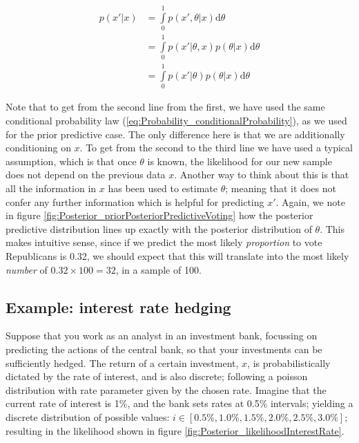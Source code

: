 \documentclass[11pt,fullpage]{book}
\begin{document}
\begin{equation}\label{eq:Posterior_posteriorPredictiveVoting}
\begin{align}
p(x'|x) &= \int\limits_{0}^{1} p(x',\theta|x) \mathrm{d}\theta\\
&= \int\limits_{0}^{1} p(x'|\theta,x) p(\theta|x) \mathrm{d}\theta\\
&= \int\limits_{0}^{1} p(x'|\theta) p(\theta|x) \mathrm{d}\theta
\end{align}
\end{equation}

Note that to get from the second line from the first, we have used the same conditional probability law  (\ref{eq:Probability_conditionalProbability}), as we used for the prior predictive case. The only difference here is that we are additionally conditioning on $x$. To get from the second to the third line we have used a typical assumption, which is that once $\theta$ is known, the likelihood for our new sample does not depend on the previous data $x$. Another way to think about this is that all the information in $x$ has been used to estimate $\theta$; meaning that it does not confer any further information which is helpful for predicting $x'$. Again, we note in figure \ref{fig:Posterior_priorPosteriorPredictiveVoting} how the posterior predictive distribution lines up exactly with the posterior distribution of $\theta$. This makes intuitive sense, since if we predict the most likely \textit{proportion} to vote Republicans is 0.32, we should expect that this will translate into the most likely \textit{number} of $0.32\times 100=32$, in a sample of 100.

\subsection{Example: interest rate hedging}
Suppose that you work as an analyst in an investment bank, focussing on predicting the actions of the central bank, so that your investments can be sufficiently hedged. The return of a certain investment, $x$, is probabilistically dictated by the rate of interest, and is also discrete; following a poisson distribution with rate parameter given by the chosen rate. Imagine that the current rate of interest is 1\%, and the bank sets rates at 0.5\% intervals; yielding a discrete distribution of possible values: $i\in[0.5\%, 1.0\%, 1.5\%, 2.0\%, 2.5\%,3.0\% ]$; resulting in the likelihood shown in figure \ref{fig:Posterior_likelihoodInterestRate}.
\end{document}
